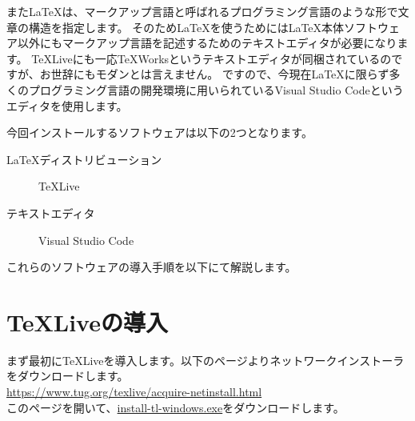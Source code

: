 \documentclass[uplatex,b5j]{jsbook}
\begin{document}
		また\LaTeX は、マークアップ言語と呼ばれるプログラミング言語のような形で文章の構造を指定します。
		そのため\LaTeX を使うためには\LaTeX 本体ソフトウェア以外にもマークアップ言語を記述するためのテキストエディタが必要になります。
		\TeX Liveにも一応\TeX Worksというテキストエディタが同梱されているのですが、お世辞にもモダンとは言えません。
		ですので、今現在\LaTeX に限らず多くのプログラミング言語の開発環境に用いられているVisual Studio Codeというエディタを使用します。

		今回インストールするソフトウェアは以下の2つとなります。
		\begin{description}
			\item[\LaTeX ディストリビューション] \TeX Live
			\item[テキストエディタ] Visual Studio Code 
		\end{description}
		これらのソフトウェアの導入手順を以下にて解説します。

	\section{\TeX Liveの導入}
		まず最初に\TeX Liveを導入します。以下のページよりネットワークインストーラをダウンロードします。	\\
		\url{https://www.tug.org/texlive/acquire-netinstall.html}	\\
		このページを開いて、\url{install-tl-windows.exe}をダウンロードします。

		
\end{document}
